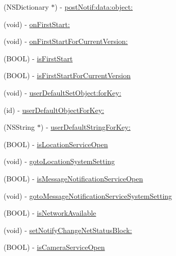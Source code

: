 \begin{DoxyCompactItemize}
\item 
(N\+S\+Dictionary $\ast$) -\/ \hyperlink{interface_m_a_r_global_manager_a89718ff05d66b235e22d2bb2513320a4}{post\+Notif\+:data\+:object\+:}
\item 
(void) -\/ \hyperlink{interface_m_a_r_global_manager_a94914844e4bcead6ec3e96b71d6f3473}{on\+First\+Start\+:}
\item 
(void) -\/ \hyperlink{interface_m_a_r_global_manager_a0fa3b3aaa9b424536891ca366c9fc2a9}{on\+First\+Start\+For\+Current\+Version\+:}
\item 
(B\+O\+OL) -\/ \hyperlink{interface_m_a_r_global_manager_ab871ef83135ce7e7f412fdebfae76c0d}{is\+First\+Start}
\item 
(B\+O\+OL) -\/ \hyperlink{interface_m_a_r_global_manager_ab111e5c33b73bd47237c0006b532655b}{is\+First\+Start\+For\+Current\+Version}
\item 
(void) -\/ \hyperlink{interface_m_a_r_global_manager_ad0611226f88f8e37f9283532f560a612}{user\+Default\+Set\+Object\+:for\+Key\+:}
\item 
(id) -\/ \hyperlink{interface_m_a_r_global_manager_aab62166fa0edc05bb9ed56bc1bc5497e}{user\+Default\+Object\+For\+Key\+:}
\item 
(N\+S\+String $\ast$) -\/ \hyperlink{interface_m_a_r_global_manager_a961a62bbc7a20740c72b8d7aa588ee5c}{user\+Default\+String\+For\+Key\+:}
\item 
(B\+O\+OL) -\/ \hyperlink{interface_m_a_r_global_manager_a0ef739e91af348c99ffff1506204e70a}{is\+Location\+Service\+Open}
\item 
(void) -\/ \hyperlink{interface_m_a_r_global_manager_a506d59a09419c0842e80f7640298dc7c}{goto\+Location\+System\+Setting}
\item 
(B\+O\+OL) -\/ \hyperlink{interface_m_a_r_global_manager_a6bf480dac3da540b165457fc6ec0125e}{is\+Message\+Notification\+Service\+Open}
\item 
(void) -\/ \hyperlink{interface_m_a_r_global_manager_a07e00e242c80b444cc1fa3f361b85c72}{goto\+Message\+Notification\+Service\+System\+Setting}
\item 
(B\+O\+OL) -\/ \hyperlink{interface_m_a_r_global_manager_aece487b3fa92b315a30b41f920368e8b}{is\+Network\+Available}
\item 
(void) -\/ \hyperlink{interface_m_a_r_global_manager_af4aa929c5726787a529c6cf01fdae535}{set\+Notify\+Change\+Net\+Status\+Block\+:}
\item 
(B\+O\+OL) -\/ \hyperlink{interface_m_a_r_global_manager_a4299c5e6af1b496cd2a23f615ddfa3cf}{is\+Camera\+Service\+Open}

\end{DoxyCompactItemize}

